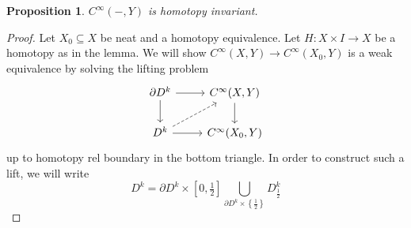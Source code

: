 \documentclass{article}
\newtheorem{proposition}[theorem]{Proposition}
\newtheorem{proposed work}[theorem]{Proposed Work}
\theoremstyle{definition}
\begin{document}
\begin{proposition}
  $C^\infty(-,Y)$ is homotopy invariant.
\end{proposition}
\begin{proof}
  Let $X_0\subseteq X$ be neat and a homotopy equivalence.
Let $H:X\times I\to X$ be a homotopy as in the lemma.
We will show $C^\infty(X,Y)\to C^\infty(X_0,Y)$ is a weak equivalence by solving the lifting problem
\[
  \begin{tikzcd}
    \partial D^k\arrow[r]\arrow[d] & C^\infty(X,Y)\arrow[d]\\
    D^k\arrow[r]\arrow[ur,dashed] & C^\infty(X_0,Y)
  \end{tikzcd}
\]
up to homotopy rel boundary in the bottom triangle. In order to construct such a lift, we will write
\[
  D^k = \partial D^k\times \left[0,\tfrac12\right]\bigcup_{\partial D^k\times\left\{\tfrac12\right\}}D^k_{\tfrac12}
\]


\end{proof}
\end{document}
